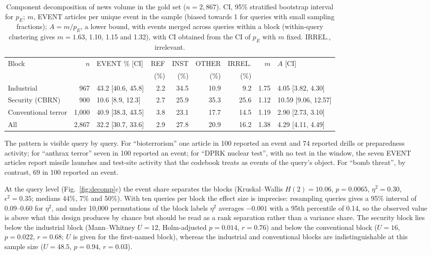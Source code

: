\documentclass[1p,times]{elsarticle}
\begin{document}
\begin{table}[!htb]
\centering\small
\caption{Component decomposition of news volume in the gold set ($n = 2{,}867$). CI, 95\% stratified bootstrap interval for $p_E$; $m$, EVENT articles per unique event in the sample (biased towards 1 for queries with small sampling fractions); $A = m/p_E$, a lower bound, with events merged across queries within a block (within-query clustering gives $m = 1.63$, 1.10, 1.15 and 1.32), with CI obtained from the CI of $p_E$ with $m$ fixed. IRREL., irrelevant.}
\label{tab:components}
\setlength{\tabcolsep}{3.5pt}
\begin{tabular*}{\textwidth}{@{\extracolsep{\fill}}lrlrrrrrl@{}}
\toprule
Block & $n$ & EVENT \% [CI] & REF & INST & OTHER & IRREL. & $m$ & $A$ [CI] \\
 & & & (\%) & (\%) & (\%) & (\%) & & \\
\midrule
Industrial & 967 & 43.2 [40.6, 45.8] & 2.2 & 34.5 & 10.9 & 9.2 & 1.75 & 4.05 [3.82, 4.30] \\
Security (CBRN) & 900 & 10.6 [8.9, 12.3] & 2.7 & 25.9 & 35.3 & 25.6 & 1.12 & 10.59 [9.06, 12.57] \\
Conventional terror & 1,000 & 40.9 [38.3, 43.5] & 3.8 & 23.1 & 17.7 & 14.5 & 1.19 & 2.90 [2.73, 3.10] \\
All & 2,867 & 32.2 [30.7, 33.6] & 2.9 & 27.8 & 20.9 & 16.2 & 1.38 & 4.29 [4.11, 4.49] \\
\bottomrule
\end{tabular*}
\end{table}

The pattern is visible query by query. For ``bioterrorism'' one article in 100 reported an event and 74 reported drills or preparedness activity; for ``anthrax terror'' seven in 100 reported an event; for ``DPRK nuclear test'', with no test in the window, the seven EVENT articles report missile launches and test-site activity that the codebook treats as events of the query's object. For ``bomb threat'', by contrast, 69 in 100 reported an event.

At the query level (Fig.~\ref{fig:decomp}c) the event share separates the blocks (Kruskal--Wallis $H(2) = 10.06$, $p = 0.0065$, $\eta^2 = 0.30$, $\epsilon^2 = 0.35$; medians 44\%, 7\% and 50\%). With ten queries per block the effect size is imprecise: resampling queries gives a 95\% interval of 0.09--0.60 for $\eta^2$, and under 10,000 permutations of the block labels $\eta^2$ averages $-0.001$ with a 95th percentile of 0.14, so the observed value is above what this design produces by chance but should be read as a rank separation rather than a variance share. The security block lies below the industrial block (Mann--Whitney $U = 12$, Holm-adjusted $p = 0.014$, $r = 0.76$) and below the conventional block ($U = 16$, $p = 0.022$, $r = 0.68$; $U$ is given for the first-named block), whereas the industrial and conventional blocks are indistinguishable at this sample size ($U = 48.5$, $p = 0.94$, $r = 0.03$).
\end{document}
